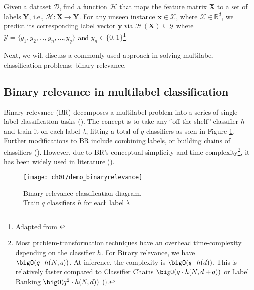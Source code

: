 \begin{definition}{}
Given a dataset $\mathcal{D}$, find a function $\mathcal{H}$ that maps the
feature matrix $\mathbf{X}$ to a set of labels $\mathbf{Y}$, i.e.,
$\mathcal{H}: \mathbf{X} \rightarrow \mathbf{Y}$. For any unseen instance
$\mathbf{x} \in \mathcal{X}$, where $\mathcal{X} \in \mathbb{R}^d$, we
predict its corresponding label vector $\mathbf{\widehat{y}}$ via
$\mathcal{H}(\mathbf{X}) \subseteq \mathcal{Y}$ where $\mathcal{Y} = \{y_1,
y_2, \dots, y_n, \dots, y_q\}$ and $y_n \in \{0,1\}$\footnote{Adapted from
\cite{zhang2014review}}.
\end{definition}

\par Next, we will discuss a commonly-used approach in solving multilabel
classification problems: binary relevance.

\subsection{Binary relevance in multilabel classification}

\par Binary relevance (BR) decomposes a multilabel problem into a series of
single-label classification tasks (\cite{godbole2004discriminative,
tsoumakas2007multilabel}). The concept is to take any ``off-the-shelf''
classifier $h$ and train it on each label $\lambda$, fitting a total of $q$
classifiers as seen in Figure \ref{demo:binaryrelevance}. Further
modifications to BR include combining labels, or building chains of
classifiers (\cite{read2009classifier}). However, due to BR's conceptual
simplicity and time-complexity\footnote[2]{
    Most problem-transformation techniques have an overhead time-complexity
    depending on the classifier $h$. For Binary relevance, we have $\bigO(q
    \cdot h(N, d))$. At inference, the complexity is $\bigO(q
    \cdot h(d))$. This is relatively faster compared to Classifier Chains
    $\bigO(q \cdot h(N, d + q))$ or Label Ranking $\bigO(q^{2} \cdot h(N, d))$
    (\cite{zhang2014review}).
}, it has been widely used in literature (\cite{zhang2017binary}).

\begin{figure}[!h]
  \centering
  \texttt{[image: ch01/demo\_binaryrelevance]}
  \caption[Binary relevance classification diagram]
  {Binary relevance classification diagram.\\Train $q$ classifiers $h$ for each
  label $\lambda$}
  \label{demo:binaryrelevance}
\end{figure}

